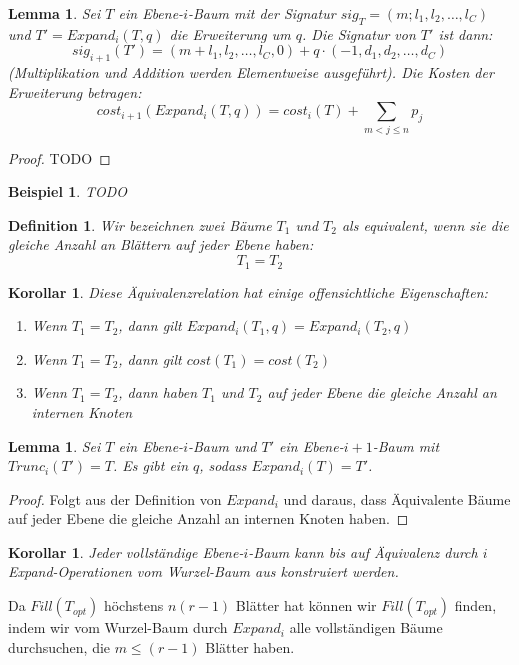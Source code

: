 \documentclass[a4paper,10pt,ngerman]{scrartcl}
\newtheorem{definition}[satz]{Definition}
\newtheorem{lemma}[satz]{Lemma}
\newtheorem{beispiel}[satz]{Beispiel}
\newtheorem{korollar}[satz]{Korollar}
\begin{document}
    \begin{lemma}
        Sei $T$ ein Ebene-$i$-Baum mit der Signatur $sig_T = (m;l_1,l_2,\dots,l_C)$ und $T' = Expand_i(T,q)$ die Erweiterung um $q$. Die Signatur von $T'$ ist dann: \[sig_{i+1}(T') = (m + l_1, l_2, \dots, l_C, 0) + q \cdot (-1, d_1, d_2, \dots, d_C)\]
        (Multiplikation und Addition werden Elementweise ausgeführt). Die Kosten der Erweiterung betragen:
        \[cost_{i+1}(Expand_i(T,q)) = cost_i(T) + \sum_{m < j \le n}p_j\]
    \end{lemma}
    \begin{proof}
        TODO
    \end{proof}
    \begin{beispiel}
        TODO
    \end{beispiel}

    \begin{definition}
        Wir bezeichnen zwei Bäume $T_1$ und $T_2$ als equivalent, wenn sie die gleiche Anzahl an Blättern auf jeder Ebene haben:
        \[T_1 = T_2\]
    \end{definition}
    \begin{korollar}
        Diese Äquivalenzrelation hat einige offensichtliche Eigenschaften:
        \begin{enumerate}
            \item Wenn $T_1 = T_2$, dann gilt $Expand_i(T_1, q) = Expand_i(T_2, q)$
            \item Wenn $T_1 = T_2$, dann gilt $cost(T_1) = cost(T_2)$
            \item Wenn $T_1 = T_2$, dann haben $T_1$ und $T_2$ auf jeder Ebene die gleiche Anzahl an internen Knoten
        \end{enumerate}
    \end{korollar}
    \begin{lemma}
        Sei $T$ ein Ebene-$i$-Baum und $T'$ ein Ebene-$i+1$-Baum mit $Trunc_i(T') = T$.
        Es gibt ein $q$, sodass $Expand_i(T) = T'$.
    \end{lemma}
    \begin{proof}
        Folgt aus der Definition von $Expand_i$ und daraus, dass Äquivalente Bäume auf jeder Ebene die gleiche Anzahl an internen Knoten haben.
    \end{proof}
    \begin{korollar}
        \label{lem:funktioniert}
        Jeder vollständige Ebene-$i$-Baum kann bis auf Äquivalenz durch $i$ Expand-Operationen vom Wurzel-Baum aus konstruiert werden.
    \end{korollar}
    Da $Fill(T_{opt})$ höchstens $n (r -1)$ Blätter hat können wir $Fill(T_{opt})$ finden, indem wir vom Wurzel-Baum %
    durch $Expand_i$ alle vollständigen Bäume durchsuchen, die $m \le (r - 1)$ Blätter haben.
\end{document}
